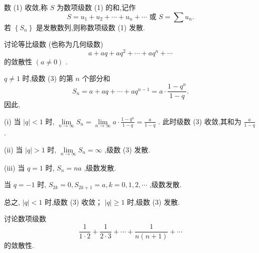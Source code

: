 数 (1) 收敛,称 \(S\) 为数项级数 (1) 的和,记作
\[
S = {u}_{1} + {u}_{2} + \cdots  + {u}_{n} + \cdots \text{ 或 }S = \sum {u}_{n}.
\]
若 \(\left\{  {S}_{n}\right\}\) 是发散数列,则称数项级数 (1) 发散.

\begin{example}

\end{example}
讨论等比级数 (也称为几何级数)
\[
a + {aq} + a{q}^{2} + \cdots  + a{q}^{n} + \cdots  \tag{3}
\]
的敛散性 \(\left( {a \neq  0}\right)\) .

\begin{solution}

\end{solution}
\(q \neq  1\) 时,级数 (3) 的第 \(n\) 个部分和
\[
{S}_{n} = a + {aq} + \cdots  + a{q}^{n - 1} = a \cdot  \frac{1 - {q}^{n}}{1 - q}.
\]
因此,

(i) 当 \(\left| q\right|  < 1\) 时, \(\mathop{\lim }\limits_{{n \rightarrow  \infty }}{S}_{n} = \mathop{\lim }\limits_{{n \rightarrow  \infty }}a \cdot  \frac{1 - {q}^{n}}{1 - q} = \frac{a}{1 - q}\) . 此时级数 (3) 收敛,其和为 \(\frac{a}{1 - q}\) .

(ii) 当 \(\left| q\right|  > 1\) 时, \(\mathop{\lim }\limits_{{n \rightarrow  \infty }}{S}_{n} = \infty\) ,级数 (3) 发散.

(iii) 当 \(q = 1\) 时, \({S}_{n} = {na}\) ,级数发散.

当 \(q =  - 1\) 时, \({S}_{2k} = 0,{S}_{{2k} + 1} = a,k = 0,1,2,\cdots\) ,级数发散.

总之, \(\left| q\right|  < 1\) 时,级数 (3) 收敛； \(\left| q\right|  \geq  1\) 时,级数 (3) 发散.

\begin{example}

\end{example}
讨论数项级数
\[
\frac{1}{1 \cdot  2} + \frac{1}{2 \cdot  3} + \cdots  + \frac{1}{n\left( {n + 1}\right) } + \cdots  \tag{4}
\]
的敛散性.

